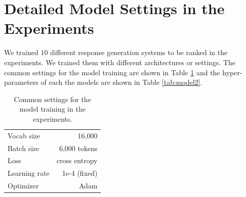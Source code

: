 \documentclass[11pt,a4paper]{article}
\begin{document}
%
\section{Detailed Model Settings in the Experiments}\label{sec:DetailedExperimentalSettings}
We trained $10$ different response generation systems to be ranked in the experiments. 
We trained them with different architectures or settings. 
The common settings for the model training are shown in Table \ref{tab:model1} and the hyper-parameters of each the models are shown in Table \ref{tab:model2}.
%




\begin{table}[h]
\small
\tabcolsep 14pt
\centering
\begin{tabular}{p{8em}r}
\toprule
Vocab size      & 16,000        \\
Batch size      & 6,000 tokens  \\
Loss            & cross entropy \\
Learning rate   & 1e-4 (fixed)  \\
Optimizer       & Adam          \\ 
\bottomrule
\end{tabular}
\caption{Common settings for the model training in the experiments.}
\label{tab:model1}
\end{table}
\end{document}
